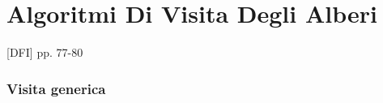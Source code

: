 \documentclass{article}
\begin{document}
\hypertarget{h.ike679k4smgg}{\section{\texorpdfstring{{Algoritmi Di
Visita Degli
Alberi}}{Algoritmi Di Visita Degli Alberi}}\label{h.ike679k4smgg}}

{{[}DFI{]} pp. 77-80}

\hypertarget{h.dvc71mavuqx7}{\subsubsection{\texorpdfstring{{Visita
generica}}{Visita generica}}\label{h.dvc71mavuqx7}}

{}

\protect\hypertarget{t.3fc5afa232d0d5009ba66fff59b11fc6057a782f}{}{}\protect\hypertarget{t.13}{}{}
\end{document}
